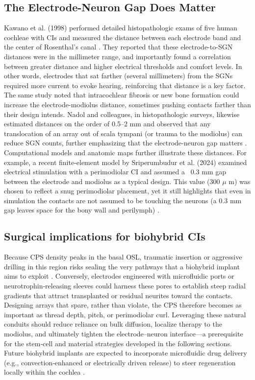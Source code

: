 \subsection{The Electrode-Neuron Gap Does Matter}
Kawano et al. (1998) performed detailed histopathologic exams of five human cochleae with CIs and measured the distance between each electrode band and the center of Rosenthal’s canal \cite{Kawano1998}. They reported that these electrode-to-SGN distances were in the millimeter range, and importantly found a correlation between greater distance and higher electrical thresholds and comfort levels. In other words, electrodes that sat farther (several millimeters) from the SGNs required more current to evoke hearing, reinforcing that distance is a key factor. The same study noted that intracochlear fibrosis or new bone formation could increase the electrode-modiolus distance, sometimes pushing contacts farther than their design intends. Nadol and colleagues, in histopathologic surveys, likewise estimated distances on the order of 0.5–2 mm and observed that any translocation of an array out of scala tympani (or trauma to the modiolus) can reduce SGN counts, further emphasizing that the electrode-neuron gap matters \cite{nadol1990,Nadol1989}. Computational models and anatomic maps further illustrate these distances. For example, a recent finite-element model by Sriperumbudur et al. (2024) examined electrical stimulation with a perimodiolar CI and assumed a ~0.3 mm gap between the electrode and modiolus as a typical design. This value (300 $\mu$ m) was chosen to reflect a snug perimodiolar placement, yet it still highlights that even in simulation the contacts are not assumed to be touching the neurons (a 0.3 mm gap leaves space for the bony wall and perilymph) \cite{Sriperumbudur2024}. 

\subsection{Surgical implications for biohybrid CIs}  
Because CPS density peaks in the basal OSL, traumatic insertion or aggressive drilling in this region risks sealing the very pathways that a biohybrid implant aims to exploit \cite{shepherd2004}.  Conversely, electrodes engineered with microfluidic ports or neurotrophin‑releasing sleeves could harness these pores to establish steep radial gradients that attract transplanted or residual neurites toward the contacts.  Designing arrays that spare, rather than violate, the CPS therefore becomes as important as thread depth, pitch, or perimodiolar curl.  Leveraging these natural conduits should reduce reliance on bulk diffusion, localize therapy to the modiolus, and ultimately tighten the electrode–neuron interface—a prerequisite for the stem‑cell and material strategies developed in the following sections. Future biohybrid implants are expected to incorporate microfluidic drug delivery (e.g., convection‑enhanced or electrically driven release) to steer regeneration locally within the cochlea \cite{Carnicer-Lombarte:2025aa}.

